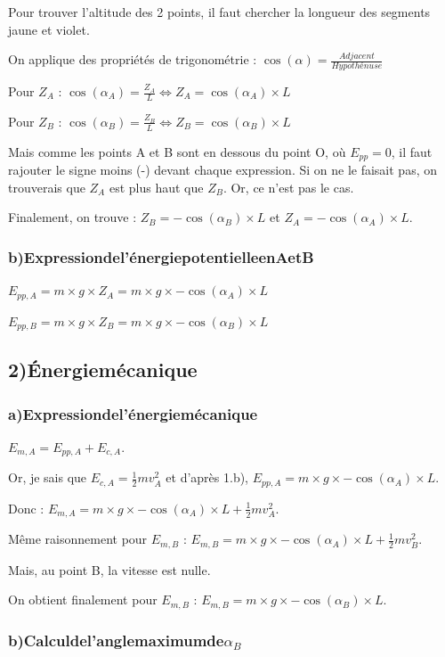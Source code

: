 \documentclass[a4paper,twoside,10pt,french]{scrartcl}
\begin{document}
Pour trouver l'altitude des 2 points, il faut chercher la longueur des segments jaune et violet.

On applique des propriétés de trigonométrie : $\cos(\alpha) = \frac{Adjacent}{Hypothénuse}$

Pour $Z_A$ : $\cos(\alpha_A) = \frac{Z_A}{L} \Leftrightarrow Z_A = \cos(\alpha_A) \times L$

Pour $Z_B$ : $\cos(\alpha_B) = \frac{Z_B}{L} \Leftrightarrow Z_B = \cos(\alpha_B) \times L$

Mais comme les points A et B sont en dessous du point O, où $E_{pp} = 0$, il faut rajouter le signe moins (-) devant chaque expression. Si on ne le faisait pas, on trouverais que $Z_A$ est plus haut que $Z_B$. Or, ce n'est pas le cas.

Finalement, on trouve : $Z_B = - \cos(\alpha_B) \times L$ et $Z_A = - \cos(\alpha_A) \times L$.
\subsubsection{b)Expression\:de\:l'énergie\:potentielle\:en\:A\:et\:B}
$E_{pp, A} = m \times g \times Z_A = m \times g \times - \cos(\alpha_A) \times L$

$E_{pp, B} = m \times g \times Z_B = m \times g \times - \cos(\alpha_B) \times L$

\subsection{2)Énergie\:mécanique}
\subsubsection{a)Expression\:de\:l'énergie\:mécanique}
$E_{m, A} = E_{pp, A} + E_{c, A}$.

Or, je sais que $E_{c, A} = \frac{1}{2}mv_A^2$ et d'après 1.b), $E_{pp, A} = m \times g \times - \cos(\alpha_A) \times L$.

Donc : $E_{m, A} = m \times g \times - \cos(\alpha_A) \times L + \frac{1}{2}mv_A^2$.

Même raisonnement pour $E_{m, B}$ : $E_{m, B} = m \times g \times - \cos(\alpha_A) \times L + \frac{1}{2}mv_B^2$.

Mais, au point B, la vitesse est nulle.

On obtient finalement pour $E_{m, B}$ : $E_{m, B} = m \times g \times - \cos(\alpha_B) \times L$.
\subsubsection{b)Calcul\:de\:l'angle\:maximum\:de\:$\alpha_B$}
\end{document}
